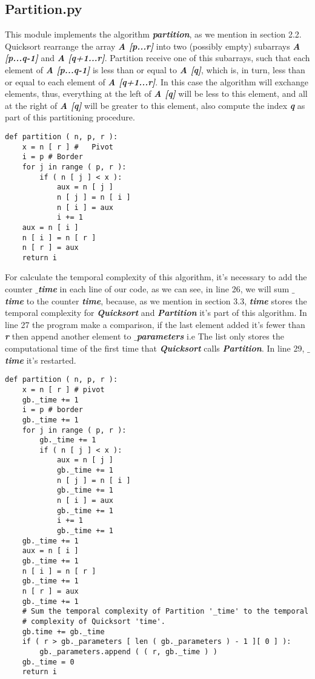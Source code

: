 \subsection{Partition.py}

This module implements the algorithm {\bfseries\itshape partition}, as we mention in section 2.2. Quicksort rearrange the array {\bfseries\itshape A [p...r]} into two (possibly empty) subarrays {\bfseries\itshape A [p...q-1]} and {\bfseries\itshape A [q+1...r]}. Partition receive one of this subarrays, such that each element of {\bfseries\itshape A [p...q-1]} is less than or equal to {\bfseries\itshape A [q]}, which is, in turn, less than or equal to each element of {\bfseries\itshape A [q+1...r]}. In this case the algorithm will exchange elements, thus, everything at the left of {\bfseries\itshape A [q]} will be less to this element, and all at the right of {\bfseries\itshape A [q]} will be greater to this element, also compute the index {\bfseries\itshape q} as part of this partitioning procedure. \hfill \break

\begin{lstlisting}
def partition ( n, p, r ):
    x = n [ r ] # 	Pivot
    i = p # Border
    for j in range ( p, r ):
        if ( n [ j ] < x ):
            aux = n [ j ]
            n [ j ] = n [ i ]
            n [ i ] = aux
            i += 1
    aux = n [ i ]
    n [ i ] = n [ r ]
    n [ r ] = aux
    return i
\end{lstlisting} \hfill

For calculate the temporal complexity of this algorithm, it's necessary to add the counter {\bfseries\itshape $\_$time} in each line of our code, as we can see, in line 26, we will sum {\bfseries\itshape $\_$time} to the counter {\bfseries\itshape time}, because, as we mention in section 3.3, {\bfseries\itshape time} stores the temporal complexity for {\bfseries\itshape Quicksort} and {\bfseries\itshape Partition} it's part of this algorithm. In line 27 the program make a comparison, if the last element added it's fewer than {\bfseries\itshape r} then append another element to {\bfseries\itshape $\_$parameters} i.e The list only stores the computational time of the first time that {\bfseries\itshape Quicksort} calls {\bfseries\itshape Partition}. In line 29, {\bfseries\itshape $\_$time} it's restarted. \hfill \break

\begin{lstlisting}
def partition ( n, p, r ):
    x = n [ r ] # pivot
    gb._time += 1
    i = p # border
    gb._time += 1
    for j in range ( p, r ):
        gb._time += 1
        if ( n [ j ] < x ):
            aux = n [ j ]
            gb._time += 1
            n [ j ] = n [ i ]
            gb._time += 1
            n [ i ] = aux
            gb._time += 1
            i += 1
            gb._time += 1
    gb._time += 1
    aux = n [ i ]
    gb._time += 1
    n [ i ] = n [ r ]
    gb._time += 1
    n [ r ] = aux
    gb._time += 1
    # Sum the temporal complexity of Partition '_time' to the temporal
    # complexity of Quicksort 'time'.
    gb.time += gb._time
    if ( r > gb._parameters [ len ( gb._parameters ) - 1 ][ 0 ] ):
        gb._parameters.append ( ( r, gb._time ) )
    gb._time = 0
    return i
\end{lstlisting} \hfill

\pagebreak
